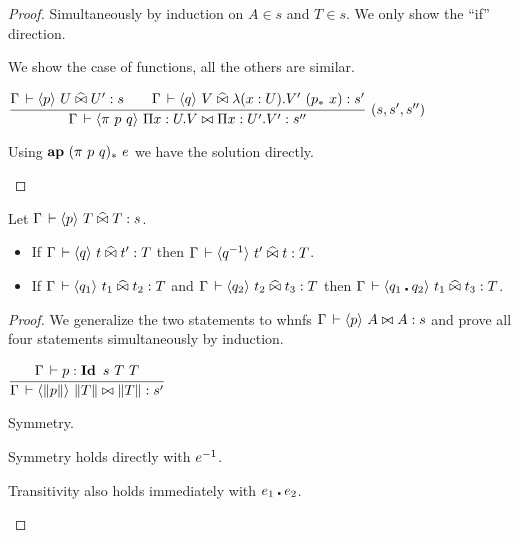 \documentclass[a4paper,english]{lipics-utf8x}
\begin{document}
  \begin{proof}
    Simultaneously by induction on $A \in s$ and $T \in s$.
    We only show the ``if'' direction.

    We show the case of functions, all the others are similar.

    \begin{caselist}
      \nextcase
      \begin{center}
      \(
        \rux{\Gamma \der \hideq{p} U \hEr U' : s \qquad
              \Gamma \der \hideq{q} V \hEr \lambda (x:U). V'\ (p_*\ x) : s'
            }{\Gamma \der \hideq{\pi\ p\ q} \Pi x:U.V \Er \Pi x:U'.V' : s''
            }{(s,s',s'')}
      \)
      \end{center}
      \begin{mathc}
      \end{mathc}
      Using $\operatorname{\mathbf{ap}~} (\pi\ p\ q)_*\ e$ we have the solution directly.
    \end{caselist}
  \end{proof}

  \begin{lemma}
    \label{lem:s-per}
    Let $\Gamma \,\vdash \langle p \rangle~ T \mathrel{\widehat{\bowtie}} T : s$.
    \leavevmode
    \begin{itemize}
      \item If $\Gamma \,\vdash \langle q \rangle~ t \mathrel{\widehat{\bowtie}} t' : T$ then
      $\Gamma \,\vdash \langle q^{-1} \rangle~ t' \mathrel{\widehat{\bowtie}} t : T$.
      \item If $\Gamma \,\vdash \langle q_1 \rangle~ t_1 \mathrel{\widehat{\bowtie}} t_2 : T$ and
      $\Gamma \,\vdash \langle q_2 \rangle~ t_2 \mathrel{\widehat{\bowtie}} t_3 : T$
      then $\Gamma \,\vdash \langle q_1 \centerdot q_2 \rangle~ t_1 \mathrel{\widehat{\bowtie}} t_3 : T$.
    \end{itemize}
  \end{lemma}

  \begin{proof}
    We generalize the two statements to whnfs
    $\Gamma \,\vdash \langle p \rangle~ A \mathrel{\bowtie} A : s$ and
    prove all four statements simultaneously by induction.

    \begin{center}
    \(
      \ru{\Gamma \der p : \Id s\ T\ T
        }{\Gamma \der \hideq{\squash{p}} \squash{T} \Er \squash{T} : s'}
    \)
    \end{center}

    \begin{caselist}
      \nextcase Symmetry.
      \begin{mathc}
      \end{mathc}
      Symmetry holds directly with $e^{-1}$.

      \nextcase Transitivity also holds immediately with $e_1 \centerdot e_2$.
    \end{caselist}
  \end{proof}
\end{document}
